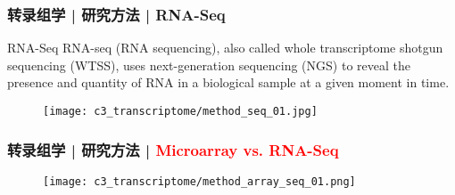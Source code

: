 \begin{frame}
  \frametitle{转录组学 | 研究方法 | RNA-Seq}
  {\footnotesize
  \begin{block}{RNA-Seq}
    RNA-seq (RNA sequencing), also called whole transcriptome shotgun sequencing (WTSS), uses next-generation sequencing (NGS) to reveal the presence and quantity of RNA in a biological sample at a given moment in time.
  \end{block}
  }
  \begin{figure}
    \centering
    \texttt{[image: c3\_transcriptome/method\_seq\_01.jpg]}
  \end{figure}
\end{frame}

\begin{frame}
  \frametitle{转录组学 | 研究方法 | \textcolor{red}{Microarray vs. RNA-Seq}}
  \begin{figure}
    \centering
    \texttt{[image: c3\_transcriptome/method\_array\_seq\_01.png]}
  \end{figure}
\end{frame}


